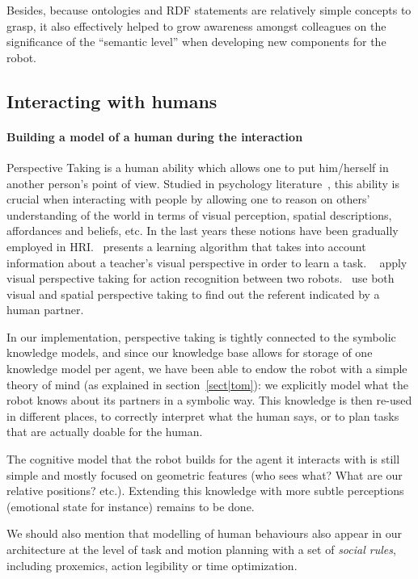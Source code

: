 \documentclass[preprint,3p,times]{elsarticle}
\begin{document}
Besides, because ontologies and RDF statements are relatively simple concepts
to grasp, it also effectively helped to grow awareness amongst colleagues on
the significance of the ``semantic level'' when developing new components for
the robot.

\subsection{Interacting with humans}

\paragraph{Building a model of a human during the interaction} Perspective
Taking is a human ability which allows one to put him/herself in another
person's point of view. Studied in psychology
literature~\cite{Flavell1992,Tversky1999}, this ability is crucial when
interacting with people by allowing one to reason on others' understanding of
the world in terms of visual perception, spatial descriptions, affordances and
beliefs, etc.  In the last years these notions have been gradually
employed in HRI.~\cite{Breazeal2006} presents a learning
algorithm that takes into account information about a teacher's visual
perspective in order to learn a task. ~\cite{Johnson2005} apply visual
perspective taking for action recognition between two
robots.~\cite{Trafton2005} use both visual and spatial perspective taking to
find out the referent indicated by a human partner.

In our implementation, perspective taking is tightly connected to the symbolic
knowledge models, and since our knowledge base allows for storage of one
knowledge model per agent, we have been able to endow the robot with a simple
theory of mind (as explained in section~\ref{sect|tom}): we explicitly model
what the robot knows about its partners in a symbolic way. This knowledge is
then re-used in different places, to correctly interpret what the human says,
or to plan tasks that are actually doable for the human.

The cognitive model that the robot builds for the agent it interacts with is
still simple and mostly focused on geometric features (who sees what? What are
our relative positions? etc.). Extending this knowledge with more subtle
perceptions (emotional state for instance) remains to be done.

We should also mention that modelling of human behaviours also appear in our
architecture at the level of task and motion planning with a set of
\emph{social rules}, including proxemics, action legibility or time
optimization.
\end{document}
